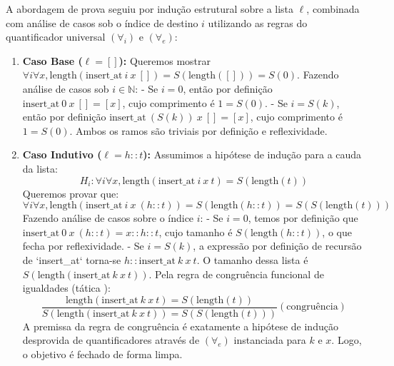 \documentclass{article}
\begin{document}
\begin{itemize}[leftmargin=*]
A abordagem de prova seguiu por indução estrutural sobre a lista $\ell$, combinada com análise de casos sob o índice de destino $i$ utilizando as regras do quantificador universal $(\forall_i)$ e $(\forall_e)$:
\begin{enumerate}[leftmargin=*]
\item \textbf{Caso Base ($\ell = []$):} Queremos mostrar $\forall i \forall x, \text{length}(\text{insert\_at} \ i \ x \ []) = S(\text{length}([])) = S(0)$. Fazendo análise de casos sob $i \in \mathbb{N}$:
  - Se $i = 0$, então por definição $\text{insert\_at} \ 0 \ x \ [] = [x]$, cujo comprimento é $1 = S(0)$.
  - Se $i = S(k)$, então por definição $\text{insert\_at} \ (S(k)) \ x \ [] = [x]$, cujo comprimento é $1 = S(0)$.
  Ambos os ramos são triviais por definição e reflexividade.
\item \textbf{Caso Indutivo ($\ell = h :: t$):} Assumimos a hipótese de indução para a cauda da lista:
  $$H_i: \forall i \forall x, \text{length}(\text{insert\_at} \ i \ x \ t) = S(\text{length}(t))$$
  Queremos provar que:
  $$\forall i \forall x, \text{length}(\text{insert\_at} \ i \ x \ (h :: t)) = S(\text{length}(h :: t)) = S(S(\text{length}(t)))$$
  Fazendo análise de casos sobre o índice $i$:
  - Se $i = 0$, temos por definição que $\text{insert\_at} \ 0 \ x \ (h :: t) = x :: h :: t$, cujo tamanho é $S(\text{length}(h :: t))$, o que fecha por reflexividade.
  - Se $i = S(k)$, a expressão por definição de recursão de `insert\_at` torna-se $h :: \text{insert\_at} \ k \ x \ t$. O tamanho dessa lista é $S(\text{length}(\text{insert\_at} \ k \ x \ t))$. Pela regra de congruência funcional de igualdades (tática ):
    $$\frac{\text{length}(\text{insert\_at} \ k \ x \ t) = S(\text{length}(t))}{S(\text{length}(\text{insert\_at} \ k \ x \ t)) = S(S(\text{length}(t)))} (\text{congruência})$$
    A premissa da regra de congruência é exatamente a hipótese de indução desprovida de quantificadores através de $(\forall_e)$ instanciada para $k$ e $x$. Logo, o objetivo é fechado de forma limpa.
\end{enumerate}


\end{itemize}
\end{document}
